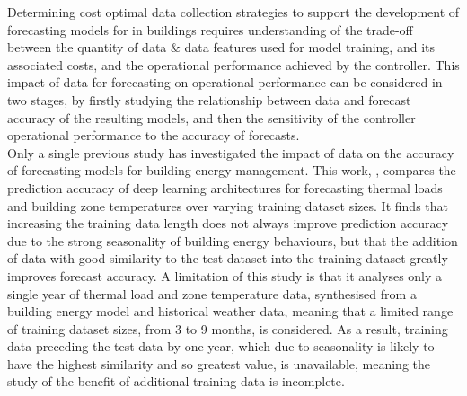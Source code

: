 Determining cost optimal data collection strategies to support the development of forecasting models for  in buildings requires understanding of the trade-off between the quantity of data \& data features used for model training, and its associated costs, and the operational performance achieved by the controller. This impact of data for forecasting on  operational performance can be considered in two stages, by firstly studying the relationship between data and forecast accuracy of the resulting models, and then the sensitivity of the controller operational performance to the accuracy of forecasts.\\

Only a single previous study has investigated the impact of data on the accuracy of forecasting models for building energy management. This work, \citep{choi2023PerformanceEvaluationDeep}, compares the prediction accuracy of deep learning architectures for forecasting thermal loads and building zone temperatures over varying training dataset sizes. It finds that increasing the training data length does not always improve prediction accuracy due to the strong seasonality of building energy behaviours, but that the addition of data with good similarity to the test dataset into the training dataset greatly improves forecast accuracy. A limitation of this study is that it analyses only a single year of thermal load and zone temperature data, synthesised from a building energy model and historical weather data, meaning that a limited range of training dataset sizes, from 3 to 9 months, is considered. As a result, training data preceding the test data by one year, which due to seasonality is likely to have the highest similarity and so greatest value, is unavailable, meaning the study of the benefit of additional training data is incomplete.\\

